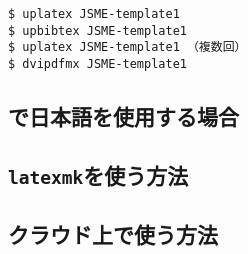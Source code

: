 \begin{tcolorbox}[enhanced, title=\pdfLaTeX$+$\upBibTeX, drop fuzzy shadow]
\begin{verbatim}
$ uplatex JSME-template1
$ upbibtex JSME-template1
$ uplatex JSME-template1 （複数回）
$ dvipdfmx JSME-template1
\end{verbatim}
\end{tcolorbox}


\subsection{\pdfLaTeX で日本語を使用する場合}
\label{ssec:pdflatex_jp}

\subsection{\texttt{latexmk}を使う方法}
\label{ssec:latexmk}

\lipsum[1-8]

\subsection{クラウド上で使う方法}
\label{ssec:cloud}


\lipsum[1-4]
